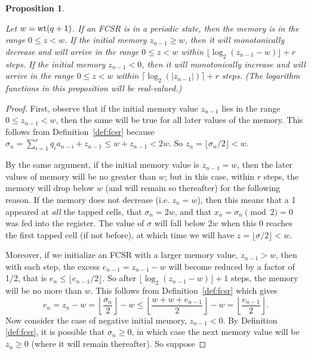 \documentclass[english]{article}
\theoremstyle{plain}
\newtheorem{proposition}[theorem]{Proposition}%
\theoremstyle{definition}
\theoremstyle{remark}
\begin{document}
\begin{proposition}{\rm \cite{art:kg97}}\label{prop:mem-bound}
  \par Let $w={\rm wt}(q+1)$. If an FCSR is in a periodic state, then the memory
  is in the range $0\leq z<w$. If the initial memory $z_{n-1}\geq w$, then it
  will monotonically decrease and will arrive in the range $0\leq z<w$ within
  $\lfloor\log_2(z_{n-1}-w)\rfloor+r$ steps. If the initial memory $z_{n-1}<0$,
  then it will monotonically increase and will arrive in the range $0\leq z<w$
  within $\lceil\log_2(|z_{n-1}|)\rceil+r$ steps. (The logarithm functions in
  this proposition will be real-valued.)
\end{proposition}
\begin{proof}
  \par First, observe that if the initial memory value $z_{n-1}$ lies in the
  range $0\leq z_{n-1}<w$, then the same will be true for all later values of
  the memory. This follows from Definition~\ref{def:fcsr} because
  $\sigma_n = \sum^r_{i=1}q_ia_{n-i}+z_{n-1} \leq w+z_{n-1} < 2w$. So
  $z_n=\lfloor\sigma_n/2\rfloor<w$.
  \par By the same argument, if the initial memory value is $z_{n-1}=w$, then
  the later values of memory will be no greater than $w$; but in this case,
  within $r$ steps, the memory will drop below $w$ (and will remain so
  thereafter) for the following reason. If the memory does not decrease (i.e.
  $z_n=w$), then this means that a 1 appeared at {\it all} the tapped cells,
  that $\sigma_n=2w$, and that $x_n=\sigma_n\pmod2=0$ was fed into the register.
  The value of $\sigma$ will fall below $2w$ when this 0 reaches the first
  tapped cell (if not before), at which time we will have
  $z=\lfloor\sigma/2\rfloor<w$.
  \par Moreover, if we initialize an FCSR with a larger memory value,
  $z_{n-1}>w$, then with each step, the excess $e_{n-1}=z_{n-1}-w$ will become
  reduced by a factor of 1/2, that is $e_n\leq\lfloor e_{n-1}/2\rfloor$. So
  after $\lfloor\log_2(z_{n-1}-w)\rfloor+1$ steps, the memory will be no more
  than $w$. This follows from Definition~\ref{def:fcsr} which gives
  \[
    e_n=z_n-w=\left\lfloor\frac{\sigma_n}{2}\right\rfloor-w
    \leq\left\lfloor\frac{w+w+e_{n-1}}{2}\right\rfloor-w
    =\left\lfloor\frac{e_{n-1}}{2}\right\rfloor.
  \]
  Now consider the case of negative initial memory, $z_{n-1}<0$. By Definition
  \ref{def:fcsr}, it is possible that $\sigma_n\geq0$, in which case the next
  memory value will be $z_n\geq0$ (where it will remain thereafter). So suppose

\end{proof}
\end{document}
